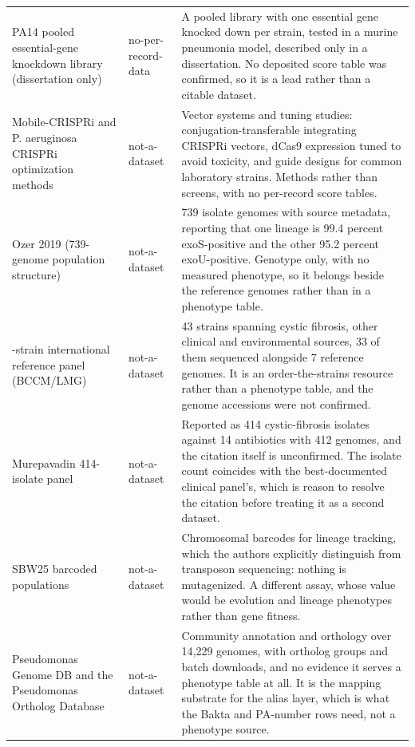 \begin{longtable}{@{}L{58mm} L{26mm} L{88mm}@{}}
\addlinespace[5pt]
PA14 pooled essential-gene knockdown library (dissertation only) & no-per-record-data & A pooled library with one essential gene knocked down per strain, tested in a murine pneumonia model, described only in a dissertation. No deposited score table was confirmed, so it is a lead rather than a citable dataset. \\
\addlinespace[5pt]
Mobile-CRISPRi and P. aeruginosa CRISPRi optimization methods & not-a-dataset & Vector systems and tuning studies: conjugation-transferable integrating CRISPRi vectors, dCas9 expression tuned to avoid toxicity, and guide designs for common laboratory strains. Methods rather than screens, with no per-record score tables. \\
\addlinespace[5pt]
Ozer 2019 (739-genome population structure) & not-a-dataset & 739 isolate genomes with source metadata, reporting that one lineage is 99.4 percent exoS-positive and the other 95.2 percent exoU-positive. Genotype only, with no measured phenotype, so it belongs beside the reference genomes rather than in a phenotype table. \\
-strain international reference panel (BCCM/LMG) & not-a-dataset & 43 strains spanning cystic fibrosis, other clinical and environmental sources, 33 of them sequenced alongside 7 reference genomes. It is an order-the-strains resource rather than a phenotype table, and the genome accessions were not confirmed. \\
\addlinespace[5pt]
Murepavadin 414-isolate panel & not-a-dataset & Reported as 414 cystic-fibrosis isolates against 14 antibiotics with 412 genomes, and the citation itself is unconfirmed. The isolate count coincides with the best-documented clinical panel's, which is reason to resolve the citation before treating it as a second dataset. \\
\addlinespace[5pt]
SBW25 barcoded populations & not-a-dataset & Chromosomal barcodes for lineage tracking, which the authors explicitly distinguish from transposon sequencing: nothing is mutagenized. A different assay, whose value would be evolution and lineage phenotypes rather than gene fitness. \\
\addlinespace[5pt]
Pseudomonas Genome DB and the Pseudomonas Ortholog Database & not-a-dataset & Community annotation and orthology over 14,229 genomes, with ortholog groups and batch downloads, and no evidence it serves a phenotype table at all. It is the mapping substrate for the alias layer, which is what the Bakta and PA-number rows need, not a phenotype source. \\

\end{longtable}
